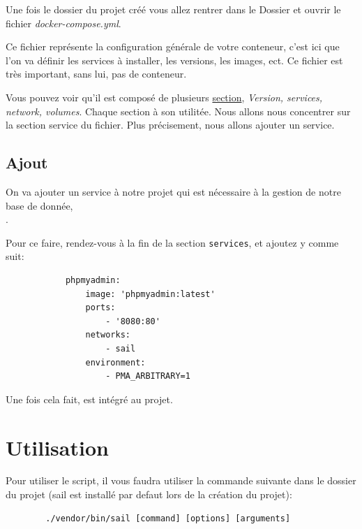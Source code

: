 \documentclass[internal]{nhitec_design}
\begin{document}
        Une fois le dossier du projet créé vous allez rentrer dans le Dossier et ouvrir le fichier \textit{docker-compose.yml}.

        Ce fichier représente la configuration générale de votre conteneur, c'est ici que l'on va définir les services à installer, les versions, les images, ect.
        Ce fichier est très important, sans lui, pas de conteneur.

        Vous pouvez voir qu'il est composé de plusieurs \href{https://docs.docker.com/compose/compose-file/}{section}, \textit{Version, services, network, volumes}. Chaque section à son utilitée. Nous allons nous concentrer sur la section service du fichier. Plus précisement, nous allons ajouter un service.\\ 


\newpage

    \subsection[Ajout PhpMyAdmin]{Ajout \phpmyadmin{}}

        On va ajouter un service à notre projet qui est nécessaire à la gestion de notre base de donnée,\\ \phpmyadmin{}.
        
        Pour ce faire, rendez-vous à la fin de la section \verb|services|, et ajoutez y \phpmyadmin{} comme suit:

        \begin{lstlisting}
            phpmyadmin:
                image: 'phpmyadmin:latest' 
                ports:
                    - '8080:80' 
                networks:
                    - sail 
                environment:
                    - PMA_ARBITRARY=1
        \end{lstlisting}

        Une fois cela fait, \phpmyadmin{} est intégré au projet.

    \section[Utilisation]{Utilisation}
    Pour utiliser le script, il vous faudra utiliser la commande suivante dans le dossier du projet (sail est installé par defaut lors de la création du projet):

    \begin{lstlisting}
        ./vendor/bin/sail [command] [options] [arguments]
    \end{lstlisting}
\end{document}
